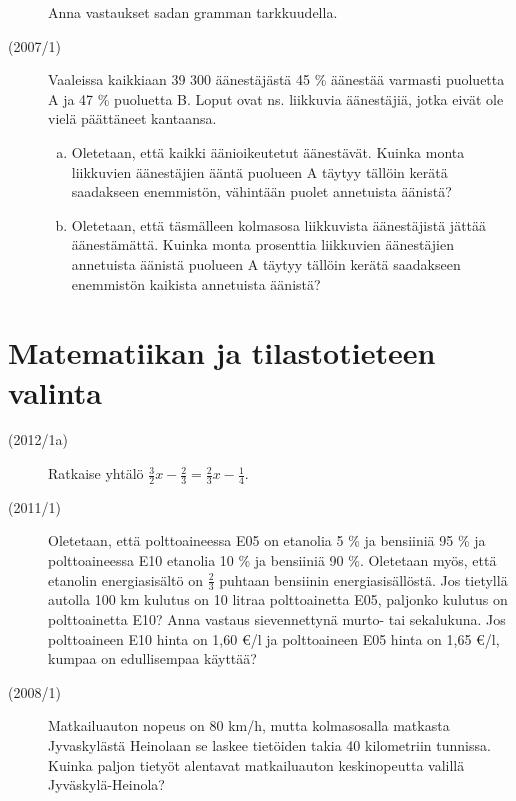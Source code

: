 \begin{description}
    	Anna vastaukset sadan gramman tarkkuudella.

	\item[(2007/1)] Vaaleissa kaikkiaan 39 300 äänestäjästä 45 \% äänestää varmasti
        puoluetta A ja 47 \% puoluetta B. Loput ovat ns. liikkuvia äänestäjiä,
        jotka eivät ole vielä päättäneet kantaansa.
	
    	\begin{enumerate}[(a)]
    		\item Oletetaan, että kaikki äänioikeutetut äänestävät. Kuinka monta
                liikkuvien äänestäjien ääntä puolueen A täytyy tällöin kerätä
                saadakseen enemmistön, vähintään puolet annetuista äänistä?
    		\item Oletetaan, että täsmälleen kolmasosa liikkuvista äänestäjistä
                jättää äänestämättä. Kuinka monta prosenttia liikkuvien äänestäjien
                annetuista äänistä puolueen A täytyy tällöin kerätä saadakseen 
    		    enemmistön kaikista annetuista äänistä?
    	\end{enumerate}	 	
	
\end{description}

\section{Matematiikan ja tilastotieteen valinta}

\begin{description}
	\item[(2012/1a)] Ratkaise yhtälö $\frac{3}{2}x - \frac{2}{3} = \frac{2}{3}x - \frac{1}{4}$.
	\item[(2011/1)] Oletetaan, että polttoaineessa E05 on etanolia 5 \% ja
        bensiiniä 95 \% ja polttoaineessa E10 etanolia 10 \% ja bensiiniä 90 \%.
        Oletetaan myös, että etanolin energiasisältö on $\frac{2}{3}$ puhtaan bensiinin
		energiasisällöstä. Jos tietyllä autolla 100 km kulutus on 10 litraa
        polttoainetta E05, paljonko kulutus on polttoainetta E10? Anna vastaus
        sievennettynä murto- tai sekalukuna. Jos polttoaineen E10 hinta on 1,60 €/l
        ja polttoaineen E05 hinta on 1,65 €/l, kumpaa on edullisempaa käyttää?
	\item[(2008/1)] Matkailuauton nopeus on 80 km/h, mutta kolmasosalla matkasta
        Jyvaskylästä Heinolaan se laskee tietöiden takia 40 kilometriin tunnissa.
        Kuinka paljon tietyöt alentavat matkailuauton keskinopeutta valillä Jyväskylä-Heinola?
\end{description}

